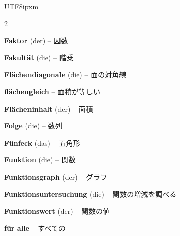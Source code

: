\begin{CJK}{UTF8}{ipxm}
\begin{multicols}{2}
\par\nopagebreak
\textbf{Faktor} (der) -- 因数\dotfill\hyperref[e:23]{\pageref*{e:23}}\par
\textbf{Fakultät} (die) -- 階乗\dotfill\hyperref[e:340]{\pageref*{e:340}}\par
\textbf{Flächendiagonale} (die) -- 面の対角線\dotfill\hyperref[e:251]{\pageref*{e:251}}\par
\textbf{flächengleich} -- 面積が等しい\dotfill\hyperref[e:195]{\pageref*{e:195}}\par
\textbf{Flächeninhalt} (der) -- 面積\dotfill\hyperref[e:210]{\pageref*{e:210}}\par
\textbf{Folge} (die) -- 数列\dotfill\hyperref[e:257]{\pageref*{e:257}}\par
\textbf{Fünfeck} (das) -- 五角形\dotfill\hyperref[e:206]{\pageref*{e:206}}\par
\textbf{Funktion} (die) -- 関数\dotfill\hyperref[e:105]{\pageref*{e:105}}\par
\textbf{Funktionsgraph} (der) -- グラフ\dotfill\hyperref[e:111]{\pageref*{e:111}}\par
\textbf{Funktionsuntersuchung} (die) -- 関数の増減を調べる\dotfill\hyperref[e:280]{\pageref*{e:280}}\par
\textbf{Funktionswert} (der) -- 関数の値\dotfill\hyperref[e:108]{\pageref*{e:108}}\par
\textbf{für alle} -- すべての\dotfill\hyperref[e:352]{\pageref*{e:352}}\par


\end{multicols}
\end{CJK}
